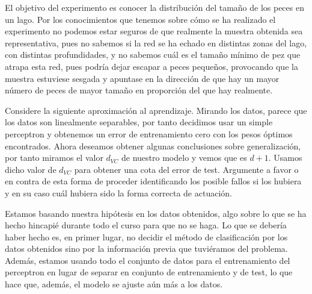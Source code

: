 \documentclass[11pt,leqno]{article}
\theoremstyle{definition}
\begin{document}
  \begin{solucion}
	  El objetivo del experimento es conocer la distribución del tamaño de los peces en un lago. Por los conocimientos que tenemos sobre cómo se ha realizado el experimento no podemos estar seguros de que realmente la muestra obtenida sea representativa, pues no sabemos si la red se ha echado en distintas zonas del lago, con distintas profundidades, y no sabemos cuál es el tamaño mínimo de pez que atrapa esta red, pues podría dejar escapar a peces pequeños, provocando que la muestra estuviese sesgada y apuntase en la dirección de que hay un mayor número de peces de mayor tamaño en proporción del que hay realmente.
  
  \end{solucion}
  
\begin{cuestion}
	Considere la siguiente aproximación al aprendizaje. Mirando los datos, parece que los datos son linealmente separables, por tanto decidimos usar un simple perceptron y obtenemos un error de entrenamiento cero con los pesos óptimos encontrados. Ahora deseamos obtener algunas conclusiones sobre generalización, por tanto miramos el valor $d_{VC}$ de nuestro modelo y vemos que es $d + 1$. Usamos dicho valor de $d_{VC}$ para obtener una cota del error de test. Argumente a favor o en contra de esta forma de proceder identificando los posible fallos si los hubiera y en su caso cuál hubiera sido la forma correcta de actuación.
\end{cuestion}

  \begin{solucion}
  	Estamos basando nuestra hipótesis en los datos obtenidos, algo sobre lo que se ha hecho hincapié durante todo el curso  para que no se haga. Lo que se debería haber hecho es, en primer lugar, no decidir el método de clasificación por los datos obtenidos sino por la información previa que tuviéramos del problema. Además, estamos usando todo el conjunto de datos para el entrenamiento del perceptron en lugar de separar en conjunto de entrenamiento y de test, lo que hace que, además, el modelo se ajuste aún más a los datos. 
  \end{solucion}
  
\end{document}

